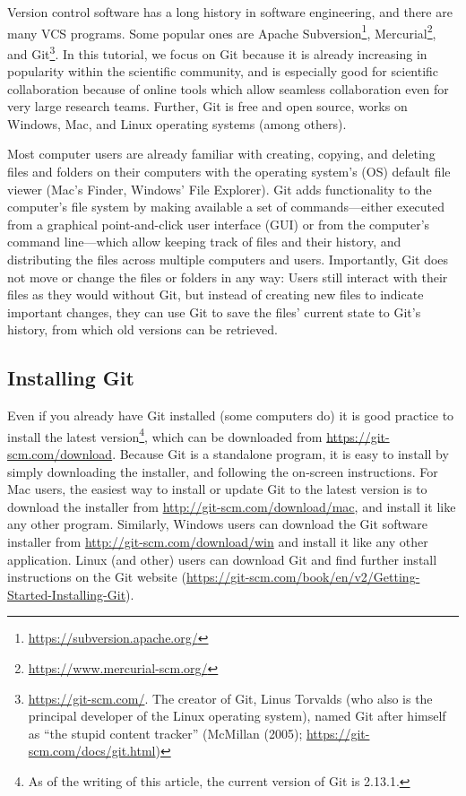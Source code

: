 \documentclass[
  american,
  ,doc,floatsintext]{apa6}
\begin{document}
Version control software has a long history in software engineering, and there are many VCS programs. Some popular ones are Apache Subversion\footnote{\url{https://subversion.apache.org/}}, Mercurial\footnote{\url{https://www.mercurial-scm.org/}}, and Git\footnote{\url{https://git-scm.com/}. The creator of Git, Linus Torvalds (who also is the principal developer of the Linux operating system), named Git after himself as ``the stupid content tracker'' (McMillan (2005); \url{https://git-scm.com/docs/git.html})}. In this tutorial, we focus on Git because it is already increasing in popularity within the scientific community, and is especially good for scientific collaboration because of online tools which allow seamless collaboration even for very large research teams. Further, Git is free and open source, works on Windows, Mac, and Linux operating systems (among others).

Most computer users are already familiar with creating, copying, and deleting files and folders on their computers with the operating system's (OS) default file viewer (Mac's Finder, Windows' File Explorer). Git adds functionality to the computer's file system by making available a set of commands---either executed from a graphical point-and-click user interface (GUI) or from the computer's command line---which allow keeping track of files and their history, and distributing the files across multiple computers and users. Importantly, Git does not move or change the files or folders in any way: Users still interact with their files as they would without Git, but instead of creating new files to indicate important changes, they can use Git to save the files' current state to Git's history, from which old versions can be retrieved.

\hypertarget{installing-git}{%
\subsection{Installing Git}\label{installing-git}}

Even if you already have Git installed (some computers do) it is good practice to install the latest version\footnote{As of the writing of this article, the current version of Git is 2.13.1.}, which can be downloaded from \url{https://git-scm.com/download}. Because Git is a standalone program, it is easy to install by simply downloading the installer, and following the on-screen instructions. For Mac users, the easiest way to install or update Git to the latest version is to download the installer from \url{http://git-scm.com/download/mac}, and install it like any other program. Similarly, Windows users can download the Git software installer from \url{http://git-scm.com/download/win} and install it like any other application. Linux (and other) users can download Git and find further install instructions on the Git website (\url{https://git-scm.com/book/en/v2/Getting-Started-Installing-Git}).
\end{document}
